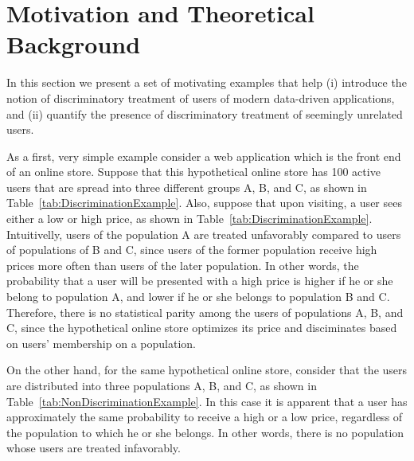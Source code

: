 
\section{Motivation and Theoretical Background}
In this section we present a set of motivating examples that help
(i) introduce the notion of discriminatory treatment of users of modern
data-driven applications, and (ii) quantify the presence of
discriminatory treatment of seemingly unrelated users.

As a first, very simple example consider a web application which is
the front end of an online store. Suppose that this hypothetical online
store has 100 active users that are spread into three different groups
A, B, and C, as shown in Table~\ref{tab:DiscriminationExample}. Also,
suppose that upon visiting, a user sees either a low or high price, as
shown in Table~\ref{tab:DiscriminationExample}. Intuitivelly, users of
the population A are treated unfavorably compared to users of populations
of B and C, since users of the former population receive high prices
more often than users of the later population. In other words, the
probability that a user will be presented with a high price is higher
if he or she belong to population A, and lower if he or she belongs to
population B and C. Therefore, there is no statistical parity among the
users of populations A, B, and C, since the hypothetical online store
optimizes its price and disciminates based on users' membership on a
population.

On the other hand, for the same hypothetical online store, consider
that the users are distributed into three populations A, B, and C, as
shown in Table~\ref{tab:NonDiscriminationExample}. In this case it is
apparent that a user has approximately the same probability to receive
a high or a low price, regardless of the population to which he or she
belongs. In other words, there is no population whose users are treated
infavorably.

